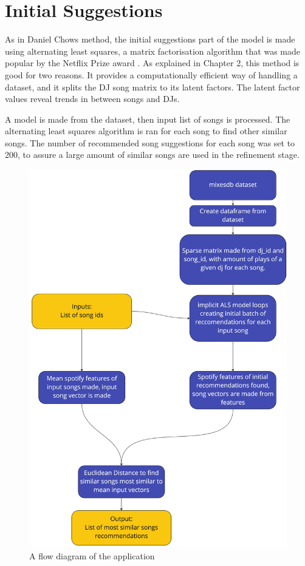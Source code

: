 \section{Initial Suggestions}
As in Daniel Chows method, the initial suggestions part of the model is made using alternating least squares, a matrix factorisation algorithm that was made popular by the Netflix Prize award \citep{zhou_large-scale_2008}. As explained in Chapter 2, this method is good for two reasons. It provides a computationally efficient way of handling a dataset, and it splits the DJ song matrix to its latent factors. The latent factor values reveal trends in between songs and DJs.

A model is made from the dataset, then input list of songs is processed. The alternating least squares algorithm is ran for each song to find other similar songs. The number of recommended song suggestions for each song was set to 200, to assure a large amount of similar songs are used in the refinement stage.
\begin{figure}[H]{\noindent\ignorespaces}
	\includegraphics[scale=0.1]{images/application_app_flow}
	\centering
	\caption{A flow diagram of the application} 
\end{figure}

